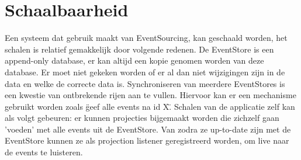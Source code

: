 
\chapter{Schaalbaarheid}
\label{ch:schaalbaarheid}

Een systeem dat gebruik maakt van EventSourcing, kan geschaald worden, het schalen is relatief gemakkelijk door volgende redenen.
De EventStore is een append-only database, er kan altijd een kopie genomen worden van deze database. Er moet niet gekeken worden of er al dan niet wijzigingen zijn in de data en welke de correcte data is. Synchroniseren van meerdere EventStores is een kwestie van ontbrekende rijen aan te vullen. Hiervoor kan er een mechanisme gebruikt worden zoals \"geef alle events na id X\".
Schalen van de applicatie zelf kan als volgt gebeuren: er kunnen projecties bijgemaakt worden die zichzelf gaan 'voeden' met alle events uit de EventStore. Van zodra ze up-to-date zijn met de EventStore kunnen ze als projection listener geregistreerd worden, om live naar de events te luisteren.